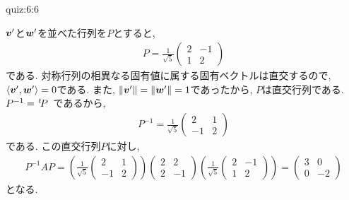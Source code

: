 \begin{answerof}{quiz:6:6}
  
  $\boldsymbol{v}'$と$\boldsymbol{w}'$を並べた行列を$P$とすると,
  \begin{align*}
    P=\frac{1}{\sqrt{5}}
    \begin{pmatrix}
      2&-1\\
      1&2
    \end{pmatrix}
  \end{align*}
  である.  対称行列の相異なる固有値に属する固有ベクトルは直交するので,
  $\Braket{\boldsymbol{v}',\boldsymbol{w}'}=0$である.
  また, $\|\boldsymbol{v}'\|=\|\boldsymbol{w}'\|=1$であったから,
  $P$は直交行列である.
  $P^{-1}={\left.^{t}\!P\right.}$
  であるから,
  \begin{align*}
    P^{-1}=\frac{1}{\sqrt{5}}
    \begin{pmatrix}
      2&1\\
      -1&2
    \end{pmatrix}
  \end{align*}
  である.
  この直交行列$P$に対し,
  \begin{align*}
    P^{-1}AP=
    (\frac{1}{\sqrt{5}}
    \begin{pmatrix}
      2&1\\
      -1&2
    \end{pmatrix})
    \begin{pmatrix}
      2&2\\2&-1
    \end{pmatrix}
    (\frac{1}{\sqrt{5}}
    \begin{pmatrix}
      2&-1\\
      1&2
    \end{pmatrix})
    =
    \begin{pmatrix}
      3&0\\0&-2
    \end{pmatrix}
  \end{align*}
  となる.
  
\end{answerof}

